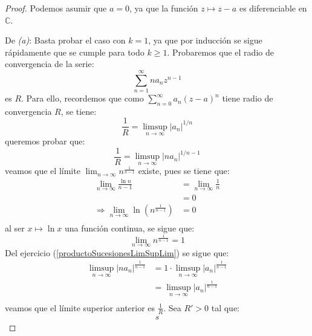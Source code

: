\documentclass[12pt]{report}
\theoremstyle{largebreak}
\newcommand\abs[1]{\ensuremath{\left|#1\right|}}
\begin{document}
    \begin{proof}
        Podemos asumir que $a=0$, ya que la función $z\mapsto z-a$ es diferenciable en $\mathbb{C}$.

        De \textit{(a)}: Basta probar el caso con $k=1$, ya que por inducción se sigue rápidamente que se cumple para todo $k\geq1$. Probaremos que el radio de convergencia de la serie:
        \begin{equation*}
            \sum_{ n=1}^\infty na_nz^{ n-1}
        \end{equation*}
        es $R$. Para ello, recordemos que como $\sum_{ n=0}^\infty a_n(z-a)^n$ tiene radio de convergencia $R$, se tiene:
        \begin{equation*}
            \frac{1}{R}=\limsup_{ n\rightarrow\infty}\abs{a_n}^{ 1/n}
        \end{equation*}
        queremos probar que:
        \begin{equation*}
            \frac{1}{R}=\limsup_{ n\rightarrow\infty}\abs{na_n}^{ 1/{n-1}}
        \end{equation*}
        veamos que el límite $\lim_{n\rightarrow\infty}n^{\frac{1}{n-1}}$ existe, pues se tiene que:
        \begin{equation*}
            \begin{split}
                \lim_{ n\rightarrow\infty}\frac{\ln n}{n-1}&=\lim_{ n\rightarrow\infty}\frac{1}{n}\\
                &=0\\
                \Rightarrow\lim_{ n\rightarrow\infty}\ln\left(n^{\frac{1}{n-1}} \right)&=0\\
            \end{split}
        \end{equation*}
        al ser $x\mapsto \ln x$ una función continua, se sigue que:
        \begin{equation*}
            \lim_{ n\rightarrow\infty}n^{\frac{1}{n-1}}=1
        \end{equation*}
        Del ejercicio (\ref{productoSucesionesLimSupLim}) se sigue que:
        \begin{equation*}
            \begin{split}
                \limsup_{ n\rightarrow\infty}\abs{na_n}^{\frac{1}{n-1}}&=1\cdot\limsup_{ n\rightarrow\infty}\abs{a_n}^{\frac{1}{n-1}}\\
                &=\limsup_{ n\rightarrow\infty}\abs{a_n}^{\frac{1}{n-1}}\\
            \end{split}
        \end{equation*}
        veamos que el límite superior anterior es $\frac{1}{R}$. Sea $R'>0$ tal que:
        \begin{equation*}
            \begin{split}
                s
            \end{split}
        \end{equation*}

    \end{proof}
\end{document}
